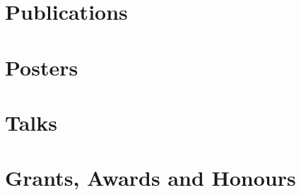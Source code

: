 \documentclass{mycv}
\begin{document}
\section{Publications}
\section{Posters}
\section{Talks}
\section{Grants, Awards and Honours}
\end{document}

